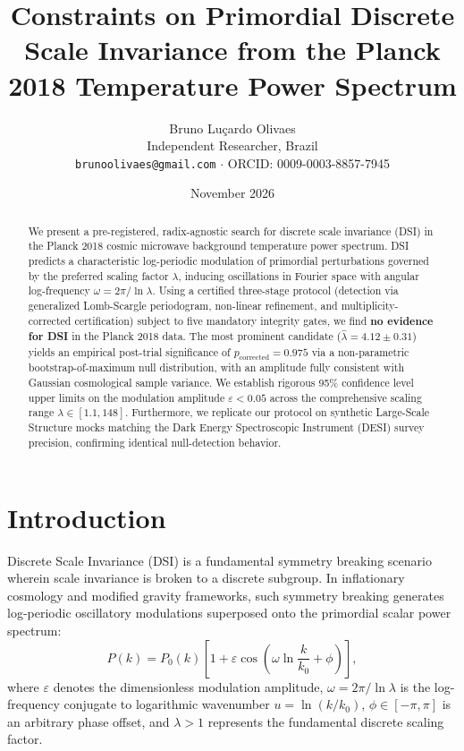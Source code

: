 \documentclass[10pt,twocolumn,a4paper]{article}
\title{\textbf{Constraints on Primordial Discrete Scale Invariance from the Planck 2018 Temperature Power Spectrum}}
\author{Bruno Lu\c{c}ardo Olivaes \\ \small Independent Researcher, Brazil \\ \small \texttt{brunoolivaes@gmail.com} $\cdot$ ORCID: 0009-0003-8857-7945}
\date{November 2026}
\begin{document}
\maketitle

\begin{abstract}
\noindent We present a pre-registered, radix-agnostic search for discrete scale invariance (DSI) in the Planck 2018 cosmic microwave background temperature power spectrum. DSI predicts a characteristic log-periodic modulation of primordial perturbations governed by the preferred scaling factor $\lambda$, inducing oscillations in Fourier space with angular log-frequency $\omega = 2\pi/\ln\lambda$. Using a certified three-stage protocol (detection via generalized Lomb-Scargle periodogram, non-linear refinement, and multiplicity-corrected certification) subject to five mandatory integrity gates, we find \textbf{no evidence for DSI} in the Planck 2018 data. The most prominent candidate ($\hat\lambda = 4.12 \pm 0.31$) yields an empirical post-trial significance of $p_{\mathrm{corrected}} = 0.975$ via a non-parametric bootstrap-of-maximum null distribution, with an amplitude fully consistent with Gaussian cosmological sample variance. We establish rigorous 95\% confidence level upper limits on the modulation amplitude $\varepsilon < 0.05$ across the comprehensive scaling range $\lambda \in [1.1, 148]$. Furthermore, we replicate our protocol on synthetic Large-Scale Structure mocks matching the Dark Energy Spectroscopic Instrument (DESI) survey precision, confirming identical null-detection behavior.
\end{abstract}

\section{Introduction}
Discrete Scale Invariance (DSI) is a fundamental symmetry breaking scenario wherein scale invariance is broken to a discrete subgroup. In inflationary cosmology and modified gravity frameworks, such symmetry breaking generates log-periodic oscillatory modulations superposed onto the primordial scalar power spectrum:
\begin{equation}
P(k) = P_0(k) \left[ 1 + \varepsilon \cos\left( \omega \ln\frac{k}{k_0} + \phi \right) \right],
\end{equation}
where $\varepsilon$ denotes the dimensionless modulation amplitude, $\omega = 2\pi/\ln\lambda$ is the log-frequency conjugate to logarithmic wavenumber $u = \ln(k/k_0)$, $\phi \in [-\pi, \pi]$ is an arbitrary phase offset, and $\lambda > 1$ represents the fundamental discrete scaling factor.
\end{document}

